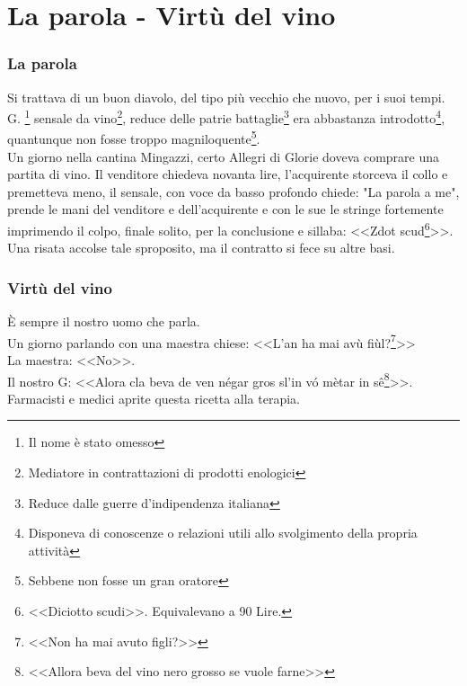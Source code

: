 
\chapter{La parola - Virtù del vino}
\subsection{La parola}
Si trattava di un buon diavolo, del tipo più vecchio che nuovo, per i suoi tempi. G. \: \:\footnote{Il nome è stato omesso} sensale da vino\footnote{Mediatore in contrattazioni di prodotti enologici}, reduce delle patrie battaglie\footnote{Reduce dalle guerre d'indipendenza italiana} era abbastanza introdotto\footnote{Disponeva di conoscenze o relazioni utili allo svolgimento della propria attività}, quantunque non fosse troppo magniloquente\footnote{Sebbene non fosse un gran oratore}.\\
\indent Un giorno nella cantina Mingazzi, certo Allegri di Glorie doveva comprare una partita di vino. Il venditore chiedeva novanta lire, l'acquirente storceva il collo e premetteva meno, il sensale, con voce da basso profondo chiede: "La parola a me", prende le mani del venditore e dell'acquirente e con le sue le stringe fortemente imprimendo il colpo, finale solito, per la conclusione e sillaba: <<Zdot scud\footnote{<<Diciotto scudi>>. Equivalevano a 90 Lire.}>>.\\
\indent Una risata accolse tale sproposito, ma il contratto si fece su altre basi.
\newpage
\subsection{Virtù del vino}
È sempre il nostro uomo che parla.\\
\indent Un giorno parlando con una maestra chiese: <<L'an ha mai avù fiùl?\footnote{<<Non ha mai avuto figli?>>}>>\\
\indent La maestra: <<No>>.\\
\indent Il nostro G: <<Alora cla beva de ven négar gros sl'in vó mètar in sê\footnote{<<Allora beva del vino nero grosso se vuole farne>>}>>.\\
\indent Farmacisti e medici aprite questa ricetta alla terapia. 
